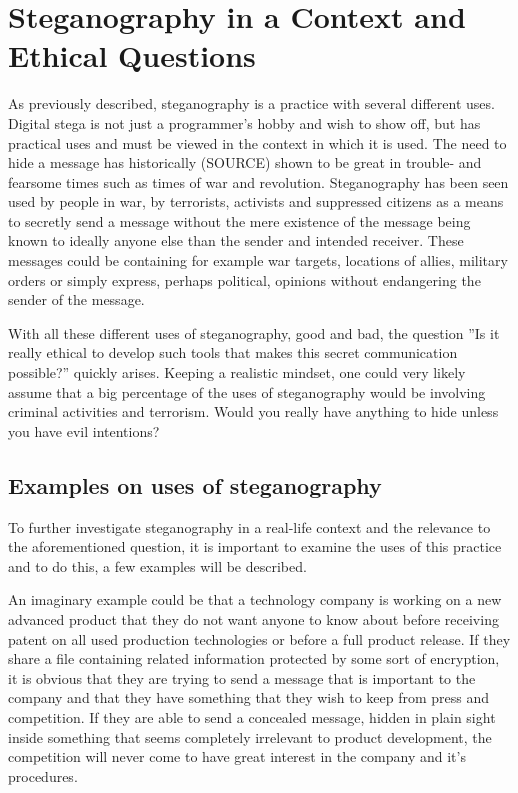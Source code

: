 \section{Steganography in a Context and Ethical Questions}
As previously described, steganography is a practice with several different uses.
Digital stega is not just a programmer's hobby and wish to show off, but has practical uses and must be viewed in the context in which it is used.
The need to hide a message has historically (SOURCE) shown to be great in trouble- and fearsome times such as times of war and revolution.
Steganography has been seen used by people in war, by terrorists, activists and suppressed citizens as a means to secretly send a message without the mere existence of the message being known to ideally anyone else than the sender and intended receiver.
These messages could be containing for example war targets, locations of allies, military orders or simply express, perhaps political, opinions without endangering the sender of the message.


With all these different uses of steganography, good and bad, the question ''Is it really ethical to develop such tools that makes this secret communication possible?'' quickly arises. Keeping a realistic mindset, one could very likely assume that a big percentage of the uses of steganography would be involving criminal activities and terrorism. Would you really have anything to hide unless you have evil intentions?

\subsection{Examples on uses of steganography}
To further investigate steganography in a real-life context and the relevance to the aforementioned question, it is important to examine the uses of this practice and to do this, a few examples will be described.

An imaginary example could be that a technology company is working on a new advanced product that they do not want anyone to know about before receiving patent on all used production technologies or before a full product release.
If they share a file containing related information protected by some sort of encryption, it is obvious that they are trying to send a message that is important to the company and that they have something that they wish to keep from press and competition.
If they are able to send a concealed message, hidden in plain sight inside something that seems completely irrelevant to product development, the competition will never come to have great interest in the company and it's procedures.

